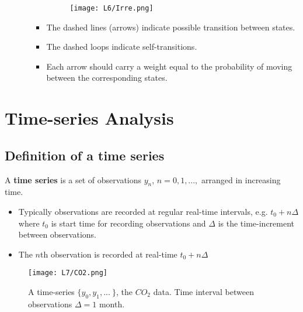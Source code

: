 \documentclass[12pt]{article}
\begin{document}
\begin{enumerate}
\begin{itemize}
\begin{itemize}
        \begin{figure}[H]
            \centering
            \texttt{[image: L6/Irre.png]}
        \end{figure}
        \item The dashed lines (arrows) indicate possible transition between states. 
        \item The dashed loops indicate self-transitions.
        \item Each arrow should carry a weight equal to the probability of moving between the corresponding states.
    \end{itemize}
    
\end{itemize}


\end{enumerate}
\section{Time-series Analysis}
\subsection{Definition of a time series}
A \textbf{time series} is a set of observations $y_n$, $n=0,1,..., $ arranged in increasing time. 
\begin{itemize}
    \item Typically observations are recorded at regular real-time intervals, e.g. $t_0 + n\Delta$ where $t_0$ is start time for recording observations and $\Delta $ is the time-increment between observations.
    \item The $n$th observation is recorded at real-time $t_0 + n\Delta$
\end{itemize}
\begin{figure}
    \centering
    \texttt{[image: L7/CO2.png]}
    \caption{A time-series $\{y_0, y_1,...\ \}$, the $CO_2$ data. Time interval between observations $\Delta = 1$ month.}
\end{figure}
\end{document}
